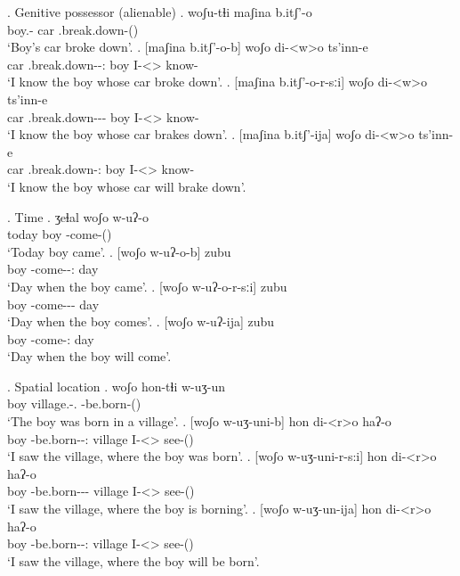 \ex. Genitive possessor (alienable)
	\ag. woʃu-tɬi maʃina b.itʃ'-o\\
			{boy.\Obl-\Gen} car {\Nanf.break.down-\Pst(\Aor)}\\
			\glt `Boy's car broke down'.
	\bg. [maʃina b.itʃ'-o-b] woʃo di-<w>o ts'inn-e\\
			car {\Nanf.break.down-\Pst-\Ptcp:\Pst} boy {I-<\M>\Aff} {know-\Hab}\\
			\glt `I know the boy whose car broke down'.
	\bg. [maʃina b.itʃ'-o-r-sːi] woʃo di-<w>o ts'inn-e\\
			car {\Nanf.break.down-\Pst-\Prog-\Attr} boy {I-<\M>\Aff} {know-\Hab}\\
			\glt `I know the boy whose car brakes down'.
	\bg. [maʃina b.itʃ'-ija] woʃo di-<w>o ts'inn-e\\
			car {\Nanf.break.down-\Ptcp:\Fut} boy {I-<\M>\Aff} {know-\Hab}\\
			\glt `I know the boy whose car will brake down'.
						
\ex. Time
	\ag. ʒeɬal woʃo w-uʔ-o\\
			today {boy} {\M-come-\Pst(\Aor)}\\
			\glt `Today boy came'.	
	\bg. [woʃo w-uʔ-o-b] zubu\\
			{boy} {\M-come-\Pst-\Ptcp:\Pst} day\\
			\glt `Day when the boy came'.
	\bg. [woʃo w-uʔ-o-r-sːi] zubu\\
			{boy} {\M-come-\Pst-\Prog-\Attr} day\\
			\glt `Day when the boy comes'.			
	\bg. [woʃo w-uʔ-ija] zubu\\
			{boy} {\M-come-\Ptcp:\Fut} day\\
			\glt `Day when the boy will come'.	

\ex. Spatial location
	\ag. woʃo hon-tɬi w-uʒ-un\\
			boy {village.\Obl-\Inter.\Ess} {\M-be.born-\Pst(\Aor)}\\
			\glt `The boy was born in a village'.
	\bg. [woʃo w-uʒ-uni-b] hon di-<r>o haʔ-o\\
			boy {\M-be.born-\Pst-\Ptcp:\Pst} village {I-<\Nans>\Aff} {see-\Pst(\Aor)}\\
			\glt `I saw the village, where the boy was born'.
	\bg. [woʃo w-uʒ-uni-r-s:i] hon di-<r>o haʔ-o\\
			boy {\M-be.born-\Pst-\Prog-\Attr} village {I-<\Nans>\Aff} {see-\Pst(\Aor)}\\
			\glt `I saw the village, where the boy is borning'.			
	\bg. [woʃo w-uʒ-un-ija] hon di-<r>o haʔ-o\\
			boy {\M-be.born-\Npst-\Ptcp:\Fut} village {I-<\Nans>\Aff} {see-\Pst(\Aor)}\\
			\glt `I saw the village, where the boy will be born'.
			
